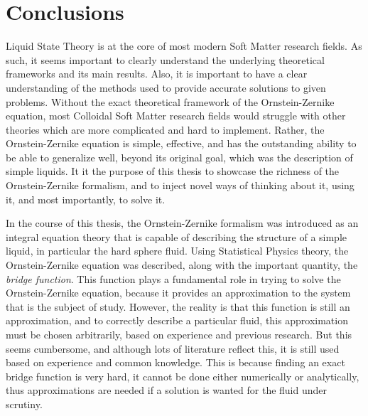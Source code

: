 \chapter{Conclusions}
\label{Cap6}

Liquid State Theory is at the core of most modern Soft Matter research fields. As such, it 
seems important to clearly understand the underlying theoretical frameworks and its main 
results. Also, it is important to have a clear understanding of the methods used to provide 
accurate solutions to given problems. Without the exact theoretical framework of the 
Ornstein-Zernike equation, most Colloidal Soft Matter research fields would struggle with 
other theories which are more complicated and hard to implement. Rather, the 
Ornstein-Zernike equation is simple, effective, and has the outstanding ability to be able 
to generalize well, beyond its original goal, which was the description of simple liquids. 
It it the purpose of this thesis to showcase the richness of the Ornstein-Zernike 
formalism, and to inject novel ways of thinking about it, using it, and most importantly, 
to solve it.

In the course of this thesis, the Ornstein-Zernike formalism was introduced as an integral 
equation theory that is capable of describing the structure of a simple liquid, in 
particular the hard sphere fluid. Using Statistical Physics theory, the Ornstein-Zernike 
equation was described, along with the important quantity, the \emph{bridge function}. This 
function plays a fundamental role in trying to solve the Ornstein-Zernike equation, because 
it provides an approximation to the system that is the subject of study. However, the 
reality is that this function is still an approximation, and to correctly describe a 
particular fluid, this approximation must be chosen arbitrarily, based on experience and 
previous research. But this seems cumbersome, and although lots of literature reflect this, 
it is still used based on experience and common knowledge. This is because finding an exact 
bridge function is very hard, it cannot be done either numerically or analytically, thus 
approximations are needed if a solution is wanted for the fluid under scrutiny.

